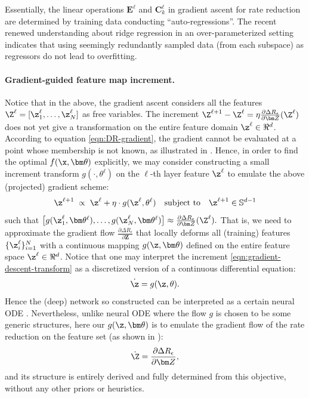 \documentclass[../../book-main.tex]{subfiles}
\begin{document}
\begin{remark}
    Essentially, the linear operations $\bm E^\ell$ and $\bm
    C_k^\ell$ in gradient ascent for rate reduction are determined by
    training data conducting ``auto-regressions''. The recent renewed
    understanding about ridge regression in an over-parameterized
    setting \cite{yang2020rethinking,Wu2020OnTO} indicates that using
    seemingly redundantly sampled data (from each subspace) as
    regressors do not lead to overfitting.
\end{remark}

\paragraph{Gradient-guided feature map increment.} Notice that in the
above, the gradient ascent considers all the features $\Z^{\ell} =
[\z^{\ell}_{1}, \dots, \z^{\ell}_{N}]$ as free variables. The
increment $\Z^{\ell+1} - \Z^{\ell} = \eta \frac{\partial \Delta
R_{\epsilon}}{\partial \bm Z}(\Z^\ell)$ does not yet give a
transformation on the entire feature domain $\z^\ell \in \Re^d$.
According to equation \eqref{eqn:DR-gradient}, the gradient cannot be
evaluated at a point whose membership is not known, as illustrated in
. Hence, in order to find the optimal
$f(\x,\bm  \theta)$ explicitly, we may consider constructing a small
increment transform $g(\cdot, \theta^{\ell})$ on the $\ell$-th
layer feature $\z^\ell$ to emulate the above (projected) gradient scheme:
\begin{equation}
    \z^{\ell + 1}   \; \propto \; \z^{\ell} + \eta\cdot  g(\z^{\ell},
    \theta^{\ell}) \quad \mbox{subject to} \quad \z^{\ell +1}
    \in \mathbb{S}^{d-1}
    \label{eqn:gradient-descent-transform}
\end{equation}
such that $\big[g(\z_1^{\ell}, \bm \theta^{\ell}), \ldots,
g(\z_N^{\ell}, \bm \theta^{\ell}) \big] \approx \frac{\partial \Delta
R_{\epsilon}}{\partial \bm Z}(\Z^\ell).$ That is, we need to
approximate the gradient flow $\frac{\partial \Delta
R_{\epsilon}}{\partial \bm Z}$ that locally deforms all (training)
features $\{\z_i^\ell\}_{i=1}^N$ with a continuous mapping $g(\z,\bm
\theta)$ defined on the entire feature space $\z^\ell \in \Re^d$.
Notice that one may interpret the increment
\eqref{eqn:gradient-descent-transform} as a discretized version of a
continuous  differential equation:
\begin{equation}
    \dot{\z} = g(\z, \theta).
\end{equation}
Hence the (deep) network so constructed can be interpreted as a
certain neural ODE \cite{chen2018neural}. Nevertheless, unlike neural
ODE where the flow $g$ is chosen to be some generic structures, here
our $g(\z, \bm\theta)$ is to emulate the gradient flow of the rate
reduction on the feature set (as shown in ):
\begin{equation*}
    \dot{\Z} = \frac{\partial \Delta R_{\epsilon}}{\partial \bm Z},
\end{equation*}
and its structure is entirely derived and fully determined from this
objective, without any other priors or heuristics.
\end{document}
